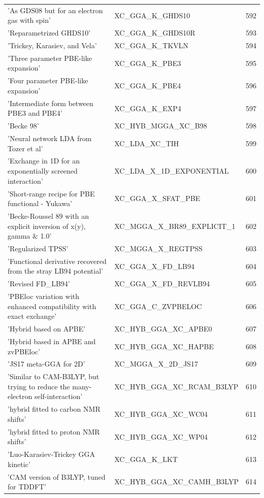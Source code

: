 \documentclass[final,12pt,makeidx,DIV=calc]{article}
\begin{document}
{{{{{{\begin{table}[!h]
\begin{center}
\begin{tabular}{llr}
  'As GDS08 but for an electron gas with spin' & XC\_GGA\_K\_GHDS10  &592\\
  'Reparametrized GHDS10' & XC\_GGA\_K\_GHDS10R  &593\\
  'Trickey, Karasiev, and Vela' & XC\_GGA\_K\_TKVLN  &594\\
  'Three parameter PBE-like expansion' & XC\_GGA\_K\_PBE3  &595\\
  'Four parameter PBE-like expansion' & XC\_GGA\_K\_PBE4  &596\\
  'Intermediate form between PBE3 and PBE4' & XC\_GGA\_K\_EXP4  &597\\
  'Becke 98' & XC\_HYB\_MGGA\_XC\_B98  &598\\
  'Neural network LDA from Tozer et al' & XC\_LDA\_XC\_TIH  &599\\
  'Exchange in 1D for an exponentially screened interaction' & XC\_LDA\_X\_1D\_EXPONENTIAL  &600\\
  'Short-range recipe for PBE functional - Yukawa' & XC\_GGA\_X\_SFAT\_PBE  &601\\
  'Becke-Roussel 89 with an explicit inversion of x(y), gamma \& 1.0' & XC\_MGGA\_X\_BR89\_EXPLICIT\_1  &602\\
  'Regularized TPSS' & XC\_MGGA\_X\_REGTPSS  &603\\
  'Functional derivative recovered from the stray LB94 potential' & XC\_GGA\_X\_FD\_LB94  &604\\
  'Revised FD\_LB94' & XC\_GGA\_X\_FD\_REVLB94  &605\\
  'PBEloc variation with enhanced compatibility with exact exchange' & XC\_GGA\_C\_ZVPBELOC  &606\\
  'Hybrid based on APBE' & XC\_HYB\_GGA\_XC\_APBE0  &607\\
  'Hybrid based in APBE and zvPBEloc' & XC\_HYB\_GGA\_XC\_HAPBE  &608\\
  'JS17 meta-GGA for 2D' & XC\_MGGA\_X\_2D\_JS17  &609\\
  'Similar to CAM-B3LYP, but trying to reduce the many-electron self-interaction' & XC\_HYB\_GGA\_XC\_RCAM\_B3LYP  &610\\
  'hybrid fitted to carbon NMR shifts' & XC\_HYB\_GGA\_XC\_WC04  &611\\
  'hybrid fitted to proton NMR shifts' & XC\_HYB\_GGA\_XC\_WP04  &612\\
  'Luo-Karasiev-Trickey GGA kinetic' & XC\_GGA\_K\_LKT  &613\\
  'CAM version of B3LYP, tuned for TDDFT' & XC\_HYB\_GGA\_XC\_CAMH\_B3LYP  &614\\

\end{tabular}
\end{center}
\end{table}}}}}}}
\end{document}
